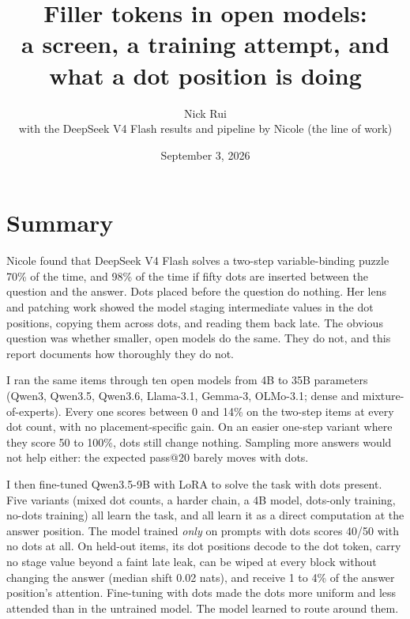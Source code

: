 \documentclass[11pt]{article}
\title{Filler tokens in open models:\\ a screen, a training attempt, and what a dot position is doing}
\author{Nick Rui \\ \small with the DeepSeek V4 Flash results and pipeline by Nicole (the \ttt{extract\_dsv4.py} line of work)}
\date{September 3, 2026}
\begin{document}
\sloppy
\maketitle

\section*{Summary}

Nicole found that DeepSeek V4 Flash solves a two-step variable-binding puzzle 70\% of the time, and 98\% of the time if fifty dots are inserted between the question and the answer. Dots placed before the question do nothing. Her lens and patching work showed the model staging intermediate values in the dot positions, copying them across dots, and reading them back late. The obvious question was whether smaller, open models do the same. They do not, and this report documents how thoroughly they do not.

I ran the same items through ten open models from 4B to 35B parameters (Qwen3, Qwen3.5, Qwen3.6, Llama-3.1, Gemma-3, OLMo-3.1; dense and mixture-of-experts). Every one scores between 0 and 14\% on the two-step items at every dot count, with no placement-specific gain. On an easier one-step variant where they score 50 to 100\%, dots still change nothing. Sampling more answers would not help either: the expected pass@20 barely moves with dots.

I then fine-tuned Qwen3.5-9B with LoRA to solve the task with dots present. Five variants (mixed dot counts, a harder chain, a 4B model, dots-only training, no-dots training) all learn the task, and all learn it as a direct computation at the answer position. The model trained \emph{only} on prompts with dots scores 40/50 with no dots at all. On held-out items, its dot positions decode to the dot token, carry no stage value beyond a faint late leak, can be wiped at every block without changing the answer (median shift 0.02 nats), and receive 1 to 4\% of the answer position's attention. Fine-tuning with dots made the dots more uniform and less attended than in the untrained model. The model learned to route around them.
\end{document}
